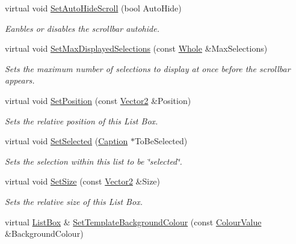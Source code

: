 \begin{DoxyCompactItemize}
virtual void \hyperlink{classMezzanine_1_1UI_1_1ListBox_a2bbbd32e977bf60ca9c91fd8bff8a7bd}{SetAutoHideScroll} (bool AutoHide)
\begin{DoxyCompactList}\small\item\em Eanbles or disables the scrollbar autohide. \item\end{DoxyCompactList}\item 
virtual void \hyperlink{classMezzanine_1_1UI_1_1ListBox_aec97a9717ade30b67b6bdf56329da13a}{SetMaxDisplayedSelections} (const \hyperlink{namespaceMezzanine_adcbb6ce6d1eb4379d109e51171e2e493}{Whole} \&MaxSelections)
\begin{DoxyCompactList}\small\item\em Sets the maximum number of selections to display at once before the scrollbar appears. \item\end{DoxyCompactList}\item 
virtual void \hyperlink{classMezzanine_1_1UI_1_1ListBox_a7446cdc56d606fe52090e13ee8078124}{SetPosition} (const \hyperlink{classMezzanine_1_1Vector2}{Vector2} \&Position)
\begin{DoxyCompactList}\small\item\em Sets the relative position of this List Box. \item\end{DoxyCompactList}\item 
virtual void \hyperlink{classMezzanine_1_1UI_1_1ListBox_a81ddebed01b1503478c2fa7b75ce4b24}{SetSelected} (\hyperlink{classMezzanine_1_1UI_1_1Caption}{Caption} $\ast$ToBeSelected)
\begin{DoxyCompactList}\small\item\em Sets the selection within this list to be \char`\"{}selected\char`\"{}. \item\end{DoxyCompactList}\item 
virtual void \hyperlink{classMezzanine_1_1UI_1_1ListBox_a69058a4d45eeb28da12993d17a878ce2}{SetSize} (const \hyperlink{classMezzanine_1_1Vector2}{Vector2} \&Size)
\begin{DoxyCompactList}\small\item\em Sets the relative size of this List Box. \item\end{DoxyCompactList}\item 
virtual \hyperlink{classMezzanine_1_1UI_1_1ListBox}{ListBox} \& \hyperlink{classMezzanine_1_1UI_1_1ListBox_a1a2f8bd297f505c405ae80cff0d0ce22}{SetTemplateBackgroundColour} (const \hyperlink{classMezzanine_1_1ColourValue}{ColourValue} \&BackgroundColour)

\end{DoxyCompactItemize}
